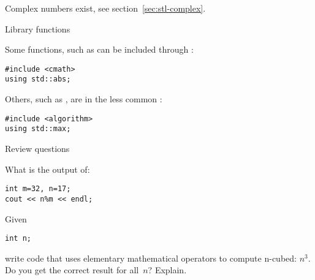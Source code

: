 Complex numbers exist, see section~\ref{sec:stl-complex}.

 {Library functions}

Some functions, such as  can be included through :
\begin{verbatim}
#include <cmath>
using std::abs;
\end{verbatim}
Others, such as , are in the less common :
\begin{verbatim}
#include <algorithm>
using std::max;
\end{verbatim}

 {Review questions}

\begin{exercise}
  \label{ex:cpp-mod}
What is the output of:
\begin{verbatim}
int m=32, n=17;
cout << n%m << endl;
\end{verbatim}
\end{exercise}

\begin{exercise}
  \label{ex:cpp-cube}
  Given
\begin{verbatim}
int n;
\end{verbatim}
write code that
uses elementary mathematical operators to compute n-cubed: $n^3$.
Do you get the correct result for all~$n$? Explain.
\end{exercise}
